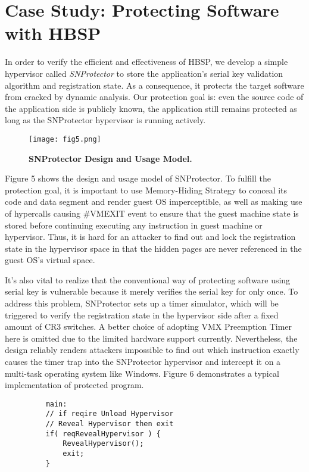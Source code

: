 \documentclass[conference]{IEEEtran}
\begin{document}
{\bigskip

\section{Case Study: Protecting Software with HBSP}
In order to verify the efficient and effectiveness of HBSP, we
develop a simple hypervisor called \emph{SNProtector} to store the
application's serial key validation algorithm and registration
state. As a consequence, it protects the target software from
cracked by dynamic analysis. Our protection goal is: even the
source code of the application side is publicly known, the
application still remains protected as long as the SNProtector
hypervisor is running actively.

\begin{figure}[!htb]
\begin{center}
\texttt{[image: fig5.png]}
\end{center}
\caption{{\bf SNProtector Design and Usage Model.}} \label{Figure
5.}
\end{figure}

Figure 5 shows the design and usage model of SNProtector. To
fulfill the protection goal, it is important to use Memory-Hiding
Strategy to conceal its code and data segment and render guest OS
imperceptible, as well as making use of hypercalls causing
\#VMEXIT event to ensure that the guest machine state is stored
before continuing executing any instruction in guest machine or
hypervisor. Thus, it is hard for an attacker to find out and lock
the registration state in the hypervisor space in that the hidden
pages are never referenced in the guest OS's virtual space.

It's also vital to realize that the conventional way of protecting
software using serial key is vulnerable because it merely verifies
the serial key for only once. To address this problem, SNProtector
sets up a timer simulator, which will be triggered to verify the
registration state in the hypervisor side after a fixed amount of
CR3 switches. A better choice of adopting VMX Preemption Timer
here is omitted due to the limited hardware support currently.
Nevertheless, the design reliably renders attackers impossible to
find out which instruction exactly causes the timer trap into the
SNProtector hypervisor and intercept it on a multi-task operating
system like Windows. Figure 6 demonstrates a typical
implementation of protected program.


\begin{figure}[!htb]
\centering
\begin{lstlisting}
    main:
    // if reqire Unload Hypervisor
    // Reveal Hypervisor then exit
    if( reqRevealHypervisor ) {
        RevealHypervisor();
        exit;
    }


\end{lstlisting}
\end{figure}}
\end{document}

